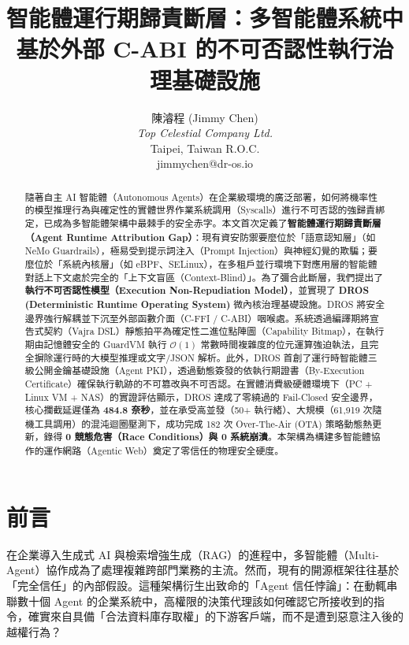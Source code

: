 \documentclass[UTF8]{ctexart}
\begin{document}
\title{智能體運行期歸責斷層：多智能體系統中基於外部 C-ABI 的不可否認性執行治理基礎設施}
\author{陳濬程 (Jimmy Chen) \\
\textit{Top Celestial Company Ltd.} \\
Taipei, Taiwan R.O.C. \\
jimmychen@dr-os.io}

\maketitle

\begin{abstract}
隨著自主 AI 智能體（Autonomous Agents）在企業級環境的廣泛部署，如何將機率性的模型推理行為與確定性的實體世界作業系統調用（Syscalls）進行不可否認的強歸責綁定，已成為多智能體架構中最棘手的安全赤字。本文首次定義了\textbf{智能體運行期歸責斷層（Agent Runtime Attribution Gap）}：現有資安防禦要麼位於「語意認知層」（如 NeMo Guardrails），極易受到提示詞注入（Prompt Injection）與神經幻覺的欺騙；要麼位於「系統內核層」（如 eBPF、SELinux），在多租戶並行環境下對應用層的智能體對話上下文處於完全的「上下文盲區（Context-Blind）」。為了彌合此斷層，我們提出了\textbf{執行不可否認性模型（Execution Non-Repudiation Model）}，並實現了 \textbf{DROS (Deterministic Runtime Operating System)} 微內核治理基礎設施。DROS 將安全邊界強行解耦並下沉至外部函數介面（C-FFI / C-ABI）咽喉處。系統透過編譯期將宣告式契約（Vajra DSL）靜態拍平為確定性二進位點陣圖（Capability Bitmap），在執行期由記憶體安全的 GuardVM 執行 $\mathcal{O}(1)$ 常數時間複雜度的位元運算強迫執法，且完全摒除運行時的大模型推理或文字/JSON 解析。此外，DROS 首創了運行時智能體三級公開金鑰基礎設施（Agent PKI），透過動態簽發的依執行期證書（By-Execution Certificate）確保執行軌跡的不可篡改與不可否認。在實體消費級硬體環境下（PC + Linux VM + NAS）的實證評估顯示，DROS 達成了零繞過的 Fail-Closed 安全邊界，核心攔截延遲僅為 \textbf{484.8 奈秒}，並在承受高並發（50+ 執行緒）、大規模（61,919 次隨機工具調用）的混沌迴圈壓測下，成功完成 182 次 Over-The-Air (OTA) 策略動態熱更新，錄得 \textbf{0 競態危害（Race Conditions）與 0 系統崩潰}。本架構為構建多智能體協作的運作網路（Agentic Web）奠定了零信任的物理安全硬度。
\end{abstract}

\section{前言}
在企業導入生成式 AI 與檢索增強生成（RAG）的進程中，多智能體（Multi-Agent）協作成為了處理複雜跨部門業務的主流。然而，現有的開源框架往往基於「完全信任」的內部假設。這種架構衍生出致命的「Agent 信任悖論」：在動輒串聯數十個 Agent 的企業系統中，高權限的決策代理該如何確認它所接收到的指令，確實來自具備「合法資料庫存取權」的下游客戶端，而不是遭到惡意注入後的越權行為？
\end{document}
